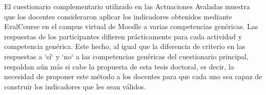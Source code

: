 
El cuestionario complementario utilizado en las Actuaciones Avaladas muestra que los docentes consideraron aplicar los indicadores obtenidos mediante EvalCourse en el campus virtual de Moodle a varias competencias genéricas. Las respuestas de los participantes difieren prácticamente para cada actividad y competencia genérica. Este hecho, al igual que la diferencia de criterio en las respuestas a `sí` y `no` a las competencias genéricas del cuestionario principal, respaldan aún más si cabe la propuesta de esta tesis doctoral, es decir, la necesidad de proponer este método a los docentes para que cada uno sea capaz de construir los indicadores que les sean válidos.





